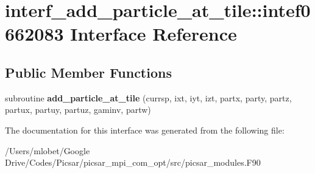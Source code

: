 \hypertarget{interfaceinterf__add__particle__at__tile_1_1intef0662083}{}\section{interf\+\_\+add\+\_\+particle\+\_\+at\+\_\+tile\+:\+:intef0662083 Interface Reference}
\label{interfaceinterf__add__particle__at__tile_1_1intef0662083}
\subsection*{Public Member Functions}
\begin{DoxyCompactItemize}
\item 
subroutine {\bfseries add\+\_\+particle\+\_\+at\+\_\+tile} (currsp, ixt, iyt, izt, partx, party, partz, partux, partuy, partuz, gaminv, partw)\hypertarget{interfaceinterf__add__particle__at__tile_1_1intef0662083_a6cdb037db796a1b3bd99de182324f14a}{}\label{interfaceinterf__add__particle__at__tile_1_1intef0662083_a6cdb037db796a1b3bd99de182324f14a}

\end{DoxyCompactItemize}


The documentation for this interface was generated from the following file\+:\begin{DoxyCompactItemize}
\item 
/\+Users/mlobet/\+Google Drive/\+Codes/\+Picsar/picsar\+\_\+mpi\+\_\+com\+\_\+opt/src/picsar\+\_\+modules.\+F90\end{DoxyCompactItemize}

